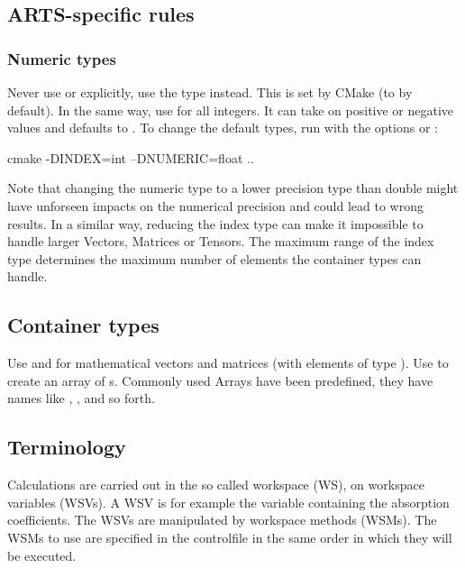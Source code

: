 \subsection{ARTS-specific rules}

\subsubsection{Numeric types}

Never use  or  explicitly, use the type
 instead. This is set by CMake (to  by
default). In the same way, use  for all integers. It can take
on positive or negative values and defaults to . To change the
default types, run  with the options 
or :

\begin{code}
cmake -DINDEX=int --DNUMERIC=float ..
\end{code}

Note that changing the numeric type to a lower precision type than
double might have unforseen impacts on the numerical precision and could
lead to wrong results. In a similar way, reducing the index type can
make it impossible to handle larger Vectors, Matrices or Tensors. The
maximum range of the index type determines the maximum number of
elements the container types can handle.

\subsection{Container types} Use  and
 for mathematical vectors and matrices (with elements
of type ). Use  to
create an array of s.
Commonly used Arrays have been predefined, they have names like
, , and so forth.

\subsection{Terminology}
Calculations are carried out in the so called workspace (WS), on
workspace variables (WSVs). A WSV is for example the variable
containing the absorption coefficients. The WSVs are manipulated by 
workspace methods (WSMs). The WSMs to use are specified in the
controlfile in the same order in which they will be
executed. 

